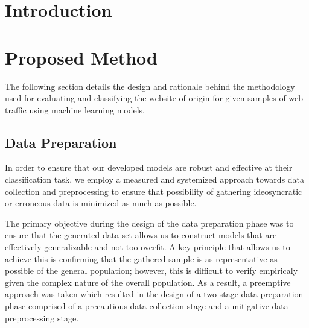 \documentclass[10pt,sigconf,letterpaper,nonacm]{acmart}
\begin{document}
\title{\PaperTitle}

\author{Charles Hu}

\begin{abstract}
  A clear and well-documented \LaTeX\ document is presented as an
  article formatted for publication by ACM in a conference proceedings
  or journal publication. Based on the ``acmart'' document class, this
  article presents and explains many of the common variations, as well
  as many of the formatting elements an author may use in the
  preparation of the documentation of their work. A cite so this compiles.
\end{abstract}


\maketitle

\section{Introduction}


\section{Proposed Method}

The following section details the design and rationale behind the methodology used for evaluating and classifying the website of origin for given samples of web traffic using machine learning models.

\subsection{Data Preparation}

In order to ensure that our developed models are robust and effective at their classification task, we employ a measured and systemized approach towards data collection and preprocessing to ensure that possibility of gathering ideosyncratic or erroneous data is minimized as much as possible.

The primary objective during the design of the data preparation phase was to ensure that the generated data set allows us to construct models that are effectively generalizable and not too overfit.
A key principle that allows us to achieve this is confirming that the gathered sample is as representative as possible of the general population; however, this is difficult to verify empiricaly given the complex nature of the overall population.
As a result, a preemptive approach was taken which resulted in the design of a two-stage data preparation phase comprised of a precautious data collection stage and a mitigative data preprocessing stage.
\end{document}
